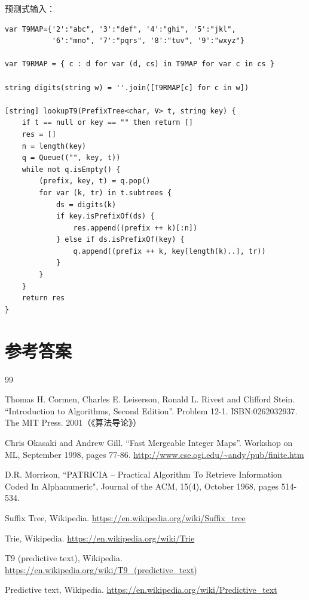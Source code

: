 \documentclass[b5paper]{ctexart}
\begin{document}
预测式输入：
\begin{lstlisting}[language = Bourbaki]
var T9MAP={'2':"abc", '3':"def", '4':"ghi", '5':"jkl",
           '6':"mno", '7':"pqrs", '8':"tuv", '9':"wxyz"}

var T9RMAP = { c : d for var (d, cs) in T9MAP for var c in cs }

string digits(string w) = ''.join([T9RMAP[c] for c in w])

[string] lookupT9(PrefixTree<char, V> t, string key) {
    if t == null or key == "" then return []
    res = []
    n = length(key)
    q = Queue(("", key, t))
    while not q.isEmpty() {
        (prefix, key, t) = q.pop()
        for var (k, tr) in t.subtrees {
            ds = digits(k)
            if key.isPrefixOf(ds) {
                res.append((prefix ++ k)[:n])
            } else if ds.isPrefixOf(key) {
                q.append((prefix ++ k, key[length(k)..], tr))
            }
        }
    }
    return res
}
\end{lstlisting}

\ifx\wholebook\relax\else
\section{参考答案}
\shipoutAnswer

\begin{thebibliography}{99}

Thomas H. Cormen, Charles E. Leiserson, Ronald L. Rivest and Clifford Stein.
``Introduction to Algorithms, Second Edition''. Problem 12-1. ISBN:0262032937. The MIT Press. 2001（《算法导论》）

Chris Okasaki and Andrew Gill. ``Fast Mergeable Integer Maps''. Workshop on ML, September 1998, pages 77-86.  \url{http://www.cse.ogi.edu/~andy/pub/finite.htm}

D.R. Morrison, ``PATRICIA -- Practical Algorithm To Retrieve  Information Coded In Alphanumeric", Journal of the ACM, 15(4), October 1968, pages 514-534.

Suffix Tree, Wikipedia. \url{https://en.wikipedia.org/wiki/Suffix_tree}

Trie, Wikipedia. \url{https://en.wikipedia.org/wiki/Trie}

T9 (predictive text), Wikipedia. \url{https://en.wikipedia.org/wiki/T9_(predictive_text)}

Predictive text,
Wikipedia. \url{https://en.wikipedia.org/wiki/Predictive_text}

\end{thebibliography}
\end{document}

